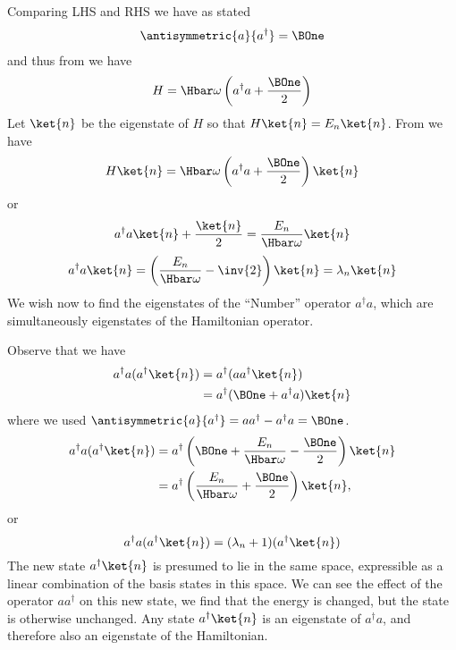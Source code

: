 %
Comparing LHS and RHS we have as stated
%
\begin{equation}\label{eqn:PHY356FLecture11:40}
\begin{aligned}
\antisymmetric{a}{a^\dagger} = \BOne
\end{aligned}
\end{equation}
%
and thus from  we have
%
\begin{equation}\label{eqn:PHY356FLecture11:50}
H = \Hbar \omega \left( a^\dagger a + \frac{\BOne}{2} \right)
\end{equation}
%
Let \(\ket{n}\) be the eigenstate of \(H\) so that \(H\ket{n} = E_n \ket{n}\).  From  we have
%
\begin{equation}\label{eqn:PHY356FLecture11:60}
H \ket{n}
=
\Hbar \omega \left( a^\dagger a + \frac{\BOne}{2} \right) \ket{n}
\end{equation}
%
or
\begin{equation}\label{eqn:PHY356FLecture11:70}
a^\dagger a \ket{n} + \frac{\ket{n}}{2} = \frac{E_n}{\Hbar \omega} \ket{n}
\end{equation}
%
\begin{equation}\label{eqn:PHY356FLecture11:80}
a^\dagger a \ket{n} = \left( \frac{E_n}{\Hbar \omega} - \inv{2} \right) \ket{n} = \lambda_n \ket{n}
\end{equation}
%
We wish now to find the eigenstates of the ``Number'' operator \(a^\dagger a\), which are simultaneously eigenstates of the Hamiltonian operator.

Observe that we have
%
\begin{equation}\label{eqn:lecture11harmonicOscillator:680}
\begin{aligned}
a^\dagger a (a^\dagger \ket{n} )
&= a^\dagger ( a a^\dagger \ket{n} ) \\
&= a^\dagger ( \BOne + a^\dagger a ) \ket{n}
\end{aligned}
\end{equation}
%
where we used \(\antisymmetric{a}{a^\dagger} = a a^\dagger - a^\dagger a = \BOne\).
%
\begin{equation}\label{eqn:lecture11harmonicOscillator:700}
\begin{aligned}
a^\dagger a (a^\dagger \ket{n} )
&= a^\dagger \left( \BOne + \frac{E_n}{\Hbar\omega} - \frac{\BOne}{2} \right) \ket{n} \\
&= a^\dagger \left( \frac{E_n}{\Hbar\omega} + \frac{\BOne}{2} \right) \ket{n},
\end{aligned}
\end{equation}
%
or
\begin{equation}\label{eqn:PHY356FLecture11:100}
a^\dagger a (a^\dagger \ket{n} ) = (\lambda_n + 1) (a^\dagger \ket{n} )
\end{equation}
%
The new state \(a^\dagger \ket{n}\) is presumed to lie in the same space, expressible as a linear combination of the basis states in this space.  We can see the effect of the operator \(a a^\dagger\) on this new state, we find that the energy is changed, but the state is otherwise unchanged.  Any state \(a^\dagger \ket{n}\) is an eigenstate of \(a^\dagger a\), and therefore also an eigenstate of the Hamiltonian.

